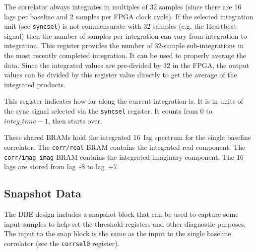 \documentclass[12pt]{article}
\begin{document}
\begin{description}
 The correlator always integrates in multiples of 32
samples (since there are 16 lags per baseline and 2 samples per FPGA clock
cycle).  If the selected integration unit (see \verb|syncsel|) is not
commensurate with 32 samples (e.g. the Heartbeat signal) then the number of
samples per integration can vary from integration to integration.  This
register provides the number of 32-sample sub-integrations in the most recently
completed integration.  It can be used to properly average the data.  Since the
integrated values are pre-divided by 32 in the FPGA, the output values can be
divided by this register value directly to get the average of the integrated
products.

 This register indicates how far along the current
integration is.  It is in units of the sync signal selected via the
\verb|syncsel| register.  It counts from 0 to $integ\_time - 1$, then starts
over.

 These shared BRAMs hold the integrated 16~lag spectrum for
the single baseline correlator.  The \verb|corr/real| BRAM contains the
integrated real component.  The \verb|corr/imag_imag| BRAM contains the
integrated imaginary component.  The 16 lags are stored from lag~-8 to lag~+7.

\end{description}

  \subsection{Snapshot Data}

The DBE design includes a snapshot block that can be used to capture some input
samples to help set the threshold registers and other diagnostic purposes.  The
input to the snap block is the same as the input to the single baseline
correlator (see the \verb|corrsel0| register).
\end{document}
